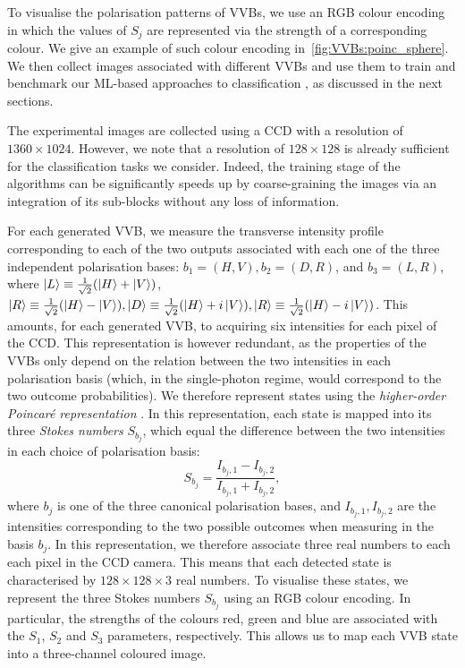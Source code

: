 To visualise the polarisation patterns of \acp{VVB}, we use an RGB colour encoding in which the values of $S_j$ are represented via the strength of a corresponding colour. We give an example of such colour encoding in~\cref{fig:VVBs:poinc_sphere}.
We then collect images associated with different \acp{VVB} and use them to train and benchmark our ML-based approaches to classification , as discussed in the next sections.


The experimental images are collected using a \ac{CCD} with a resolution of $1360 \times 1024$. 
However, we note that a resolution of $128 \times 128$ is already sufficient for the classification tasks we consider. Indeed, the training stage of the algorithms can be significantly speeds up by coarse-graining the images via an integration of its sub-blocks without any loss of information. 

For each generated \ac{VVB}, we measure the transverse intensity profile corresponding to each of the two outputs associated with each one of the three independent polarisation bases: $b_1=(H,V), b_2=(D,R)$, and $b_3=(L,R)$, where $\ket L\equiv \frac{1}{\sqrt2}(\ket H + \ket V)$, $\ket R\equiv \frac{1}{\sqrt2}(\ket H - \ket V), \ket D\equiv \frac{1}{\sqrt2}(\ket H + i \ket V), \ket R\equiv \frac{1}{\sqrt2}(\ket H - i \ket V)$.
This amounts, for each generated \ac{VVB}, to acquiring six intensities for each pixel of the \ac{CCD}. This representation is however redundant, as the properties of the VVBs only depend on the relation between the two intensities in each polarisation basis (which, in the single-photon regime, would correspond to the two outcome probabilities).
We therefore represent states using the \emph{higher-order Poincar\'e representation} \cite{milione2011higherorder,cardano2012polarization}. In this representation, each state is mapped into its three \emph{Stokes numbers} $S_{b_j}$, which equal the difference between the two intensities in each choice of polarisation basis:
\begin{equation}
  S_{b_j} = \frac{I_{b_j,1} - I_{b_j,2}}{I_{b_j,1} + I_{b_j,2}},
\end{equation}
where $b_j$ is one of the three canonical polarisation bases, and $I_{b_j,1}, I_{b_j,2}$ are the intensities corresponding to the two possible outcomes when measuring in the basis $b_j$.
In this representation, we therefore associate three real numbers to each each pixel in the \ac{CCD} camera. This means that each detected state is characterised by $128\times128\times3$ real numbers. To visualise these states, we represent the three Stokes numbers $S_{b_j}$ using an RGB colour encoding. In particular, the strengths of the colours red, green and blue are associated with the $S_{1}$, $S_{2}$ and $S_{3}$ parameters,  respectively.
This allows us to map each VVB state into a three-channel coloured image.

